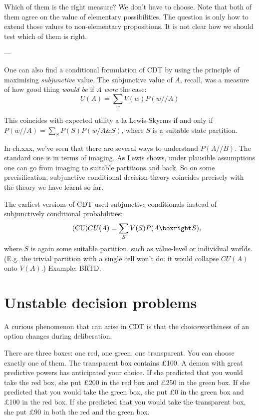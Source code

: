 {  Which of them is the right measure? We don't have to choose. Note
  that both of them agree on the value of elementary
  possibilities. The question is only how to extend those values to
  non-elementary propositions. It is not clear how we should test
  which of them is right.

  ---

  One can also find a conditional formulation of CDT by using the
  principle of maximising \emph{subjunctive} value. The subjunctive
  value of $A$, recall, was a measure of how good thing \emph{would
    be} if $A$ \emph{were} the case:
  \begin{equation}\tag{SV}
    U(A) = \sum_w V(w) P(w // A)
  \end{equation}
  
  This coincides with expected utility a la Lewis-Skyrms if and only
  if $P(w // A) = \sum_S P(S) P(w/ A\& S)$, where $S$ is a suitable
  state partition.
  
  In ch.xxx, we've seen that there are several ways to understand $P(A
  // B)$. The standard one is in terms of imaging. As Lewis shows,
  under plausible assumptions one can go from imaging to suitable
  partitions and back. So on some precisification, subjunctive
  conditional decision theory coincides precisely with the theory we
  have learnt so far.

  The earliest versions of CDT used subjunctive conditionals instead
  of subjunctively conditional probabilities:
  \begin{equation}\tag{CU}
    CU(A) = \sum_S V(S) P(A \boxright S),
  \end{equation}
  where $S$ is again some suitable partition, such as value-level or
  individual worlds. (E.g. the trivial partition with a single cell
  won't do: it would collapse $CU(A)$ onto $V(A)$.) Example: BRTD.
} %


\section{Unstable decision problems}\label{sec:unstable}

A curious phenomenon that can arise in CDT is that the
choiceworthiness of an option changes during deliberation.

\begin{example}
  There are three boxes: one red, one green, one transparent. You can
  choose exactly one of them. The transparent box contains £100. A
  demon with great predictive powers has anticipated your choice. If
  she predicted that you would take the red box, she put £200 in the
  red box and £250 in the green box. If she predicted that you would
  take the green box, she put £0 in the green box and £100 in the red
  box. If she predicted that you would take the transparent box, she
  put £90 in both the red and the green box.
\end{example}

